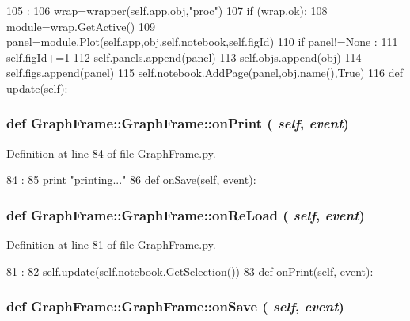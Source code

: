 \begin{DoxyCode}
105                          :
106         wrap=wrapper(self.app,obj,"proc")
107         if (wrap.ok):
108             module=wrap.GetActive()
109             panel=module.Plot(self.app,obj,self.notebook,self.figId)
110             if panel!=None :
111                 self.figId+=1
112                 self.panels.append(panel)
113                 self.objs.append(obj)
114                 self.figs.append(panel)
115                 self.notebook.AddPage(panel,obj.name(),True)
116                 
    def update(self):
\end{DoxyCode}
\hypertarget{classGraphFrame_1_1GraphFrame_ad95e1452b2b81ee03fc3d8f212cb3892}{
\subsubsection[{onPrint}]{\setlength{\rightskip}{0pt plus 5cm}def GraphFrame::GraphFrame::onPrint ( {\em self}, \/   {\em event})}}
\label{classGraphFrame_1_1GraphFrame_ad95e1452b2b81ee03fc3d8f212cb3892}


Definition at line 84 of file GraphFrame.py.


\begin{DoxyCode}
84                             :
85         print "printing..."
86 
    def onSave(self, event):
\end{DoxyCode}
\hypertarget{classGraphFrame_1_1GraphFrame_a278f797694b1612efbed2903606b4bdf}{
\subsubsection[{onReLoad}]{\setlength{\rightskip}{0pt plus 5cm}def GraphFrame::GraphFrame::onReLoad ( {\em self}, \/   {\em event})}}
\label{classGraphFrame_1_1GraphFrame_a278f797694b1612efbed2903606b4bdf}


Definition at line 81 of file GraphFrame.py.


\begin{DoxyCode}
81                              :
82         self.update(self.notebook.GetSelection())
83 
    def onPrint(self, event):
\end{DoxyCode}
\hypertarget{classGraphFrame_1_1GraphFrame_aa76dca17462ea87055ad4ab8020d3b6d}{
\subsubsection[{onSave}]{\setlength{\rightskip}{0pt plus 5cm}def GraphFrame::GraphFrame::onSave ( {\em self}, \/   {\em event})}}
\label{classGraphFrame_1_1GraphFrame_aa76dca17462ea87055ad4ab8020d3b6d}


